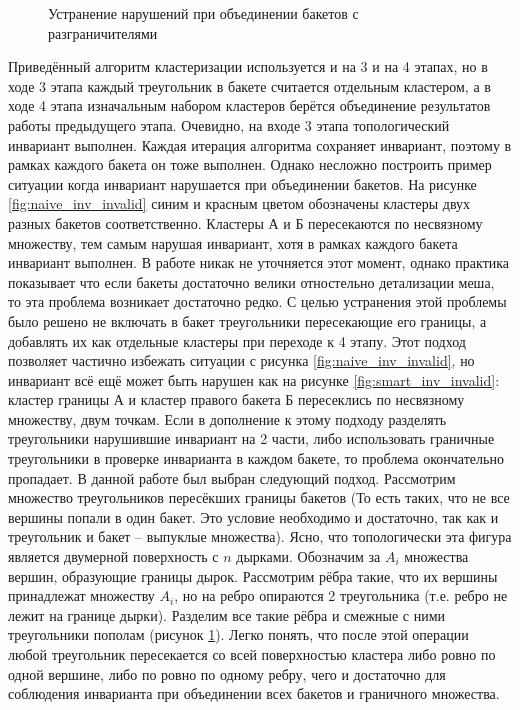 \documentclass[12pt]{extarticle}
\begin{document}
\begin{figure}[ht]
  \caption{Устранение нарушений при объединении бакетов с разграничителями}
  \label{fig:inv_valid}
\endminipage\hfill
\end{figure}
Приведённый алгоритм кластеризации используется и на 3 и на 4 этапах, но в ходе 3 этапа каждый треугольник в бакете считается отдельным кластером, а в ходе 4 этапа изначальным набором кластеров берётся объединение результатов работы предыдущего этапа. Очевидно, на входе 3 этапа топологический инвариант выполнен. Каждая итерация алгоритма сохраняет инвариант, поэтому в рамках каждого бакета он тоже выполнен. Однако несложно построить пример ситуации когда инвариант нарушается при объединении бакетов. На рисунке  \ref{fig:naive_inv_invalid} синим и красным цветом обозначены кластеры двух разных бакетов соответственно. Кластеры А и Б пересекаются по несвязному множеству, тем самым нарушая инвариант, хотя в рамках каждого бакета инвариант выполнен. В работе \cite{niski2007multi} никак не уточняется этот момент, однако практика показывает что если бакеты достаточно велики отностельно детализации меша, то эта проблема возникает достаточно редко. С целью устранения этой проблемы было решено не включать в бакет треугольники пересекающие его границы, а добавлять их как отдельные кластеры при переходе к 4 этапу. Этот подход позволяет частично избежать ситуации с рисунка \ref{fig:naive_inv_invalid}, но инвариант всё ещё может быть нарушен как на рисунке \ref{fig:smart_inv_invalid}: кластер границы А и кластер правого бакета Б пересеклись по несвязному множеству, двум точкам. Если в дополнение к этому подходу разделять треугольники нарушившие инвариант на 2 части, либо использовать граничные треугольники в проверке инварианта в каждом бакете, то проблема окончательно пропадает. В данной работе был выбран следующий подход. Рассмотрим множество треугольников пересёкших границы бакетов (То есть таких, что не все вершины попали в один бакет. Это условие необходимо и достаточно, так как и треугольник и бакет -- выпуклые множества). Ясно, что топологически эта фигура является двумерной поверхность с $n$ дырками. Обозначим за $A_i$ множества вершин, образующие границы дырок. Рассмотрим рёбра такие, что их вершины принадлежат множеству $A_i$, но на ребро опираются 2 треугольника (т.е. ребро не лежит на границе дырки). Разделим все такие рёбра и смежные с ними треугольники пополам (рисунок \ref{fig:inv_valid}). Легко понять, что после этой операции любой треугольник пересекается со всей поверхностью кластера либо ровно по одной вершине, либо по ровно по одному ребру, чего и достаточно для соблюдения инварианта при объединении всех бакетов и граничного множества.
\end{document}
